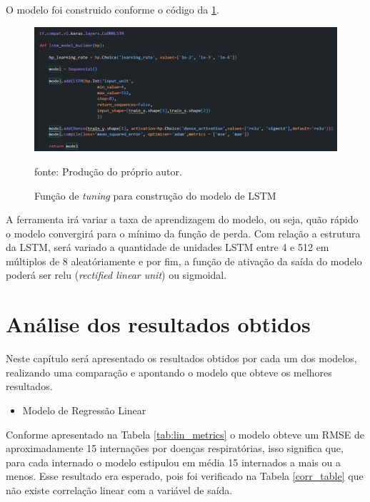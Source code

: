\documentclass[
  12pt,		%
  a4paper,	%
  openright,%
  oneside,	%
  chapter=TITLE,		%
  section=TITLE,		%
  english,	%
  french,	%
  spanish,	%
  brazil	%
]{abntex2}
\begin{document}
    O modelo foi construido conforme o código da \ref*{LSTM_model_construct}.

    \begin{figure}[ht]
        \centering
        \caption{Função de \textit{tuning} para construção do modelo de LSTM}
        \includegraphics[width=12cm]{../reports/figures/LSTM_model.png}
        \label{LSTM_model_construct}
        \par
        {\small fonte: Produção do próprio autor.}
    \end{figure}

    A ferramenta irá variar a taxa de aprendizagem do modelo, ou seja, 
    quão rápido o modelo convergirá para o mínimo da função de perda.
    Com relação a estrutura da LSTM, será variado a quantidade de unidades LSTM entre 4 e 512 em múltiplos
    de 8 aleatóriamente e por fim, a função de ativação da saída do modelo poderá ser relu (\textit{rectified linear unit}) ou sigmoidal.

    \chapter{Análise dos resultados obtidos}

    Neste capítulo será apresentado os resultados obtidos por cada um dos modelos, realizando uma comparação e
    apontando o modelo que obteve os melhores resultados.

    \begin{itemize}
        \item Modelo de Regressão Linear
    \end{itemize}

    

    Conforme apresentado na Tabela \ref*{tab:lin_metrics} o modelo obteve um RMSE de aproximadamente 15 internações por doenças
    respiratórias, isso significa que, para cada internado o modelo estipulou em média 15 internados a mais ou a menos.
    Esse resultado era esperado, pois foi verificado na Tabela \ref*{corr_table} que não 
    existe correlação linear com a variável de saída.
\end{document}
